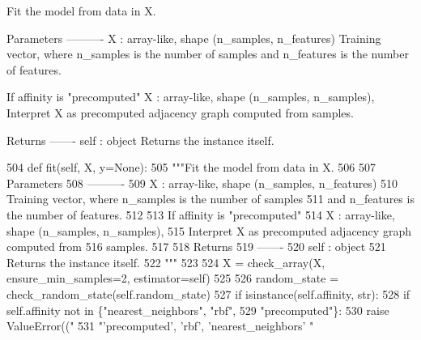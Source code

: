 \begin{DoxyVerb}Fit the model from data in X.

Parameters
----------
X : array-like, shape (n_samples, n_features)
    Training vector, where n_samples is the number of samples
    and n_features is the number of features.

    If affinity is "precomputed"
    X : array-like, shape (n_samples, n_samples),
    Interpret X as precomputed adjacency graph computed from
    samples.

Returns
-------
self : object
    Returns the instance itself.
\end{DoxyVerb}
 
\begin{DoxyCode}
504     \textcolor{keyword}{def }fit(self, X, y=None):
505         \textcolor{stringliteral}{"""Fit the model from data in X.}
506 \textcolor{stringliteral}{}
507 \textcolor{stringliteral}{        Parameters}
508 \textcolor{stringliteral}{        ----------}
509 \textcolor{stringliteral}{        X : array-like, shape (n\_samples, n\_features)}
510 \textcolor{stringliteral}{            Training vector, where n\_samples is the number of samples}
511 \textcolor{stringliteral}{            and n\_features is the number of features.}
512 \textcolor{stringliteral}{}
513 \textcolor{stringliteral}{            If affinity is "precomputed"}
514 \textcolor{stringliteral}{            X : array-like, shape (n\_samples, n\_samples),}
515 \textcolor{stringliteral}{            Interpret X as precomputed adjacency graph computed from}
516 \textcolor{stringliteral}{            samples.}
517 \textcolor{stringliteral}{}
518 \textcolor{stringliteral}{        Returns}
519 \textcolor{stringliteral}{        -------}
520 \textcolor{stringliteral}{        self : object}
521 \textcolor{stringliteral}{            Returns the instance itself.}
522 \textcolor{stringliteral}{        """}
523 
524         X = check\_array(X, ensure\_min\_samples=2, estimator=self)
525 
526         random\_state = check\_random\_state(self.random\_state)
527         \textcolor{keywordflow}{if} isinstance(self.affinity, str):
528             \textcolor{keywordflow}{if} self.affinity \textcolor{keywordflow}{not} \textcolor{keywordflow}{in} \{\textcolor{stringliteral}{"nearest\_neighbors"}, \textcolor{stringliteral}{"rbf"},
529                                      \textcolor{stringliteral}{"precomputed"}\}:
530                 \textcolor{keywordflow}{raise} ValueError((\textcolor{stringliteral}{"%
531                                   \textcolor{stringliteral}{"'precomputed', 'rbf', 'nearest\_neighbors' "}
}
\end{DoxyCode}
